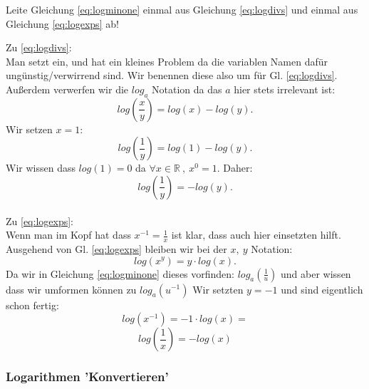 

\begin{question}
    Leite Gleichung \ref{eq:logminone} einmal aus Gleichung \ref{eq:logdivs} und einmal aus Gleichung \ref{eq:logexps} ab! 
\end{question}

\begin{answer}
Zu \ref{eq:logdivs}: \\
Man setzt ein, und hat ein kleines Problem da die variablen Namen dafür ungünstig/verwirrend sind. Wir benennen diese also um für Gl. \ref{eq:logdivs}. Außerdem verwerfen wir die $log_a$ Notation da das $a$ hier stets irrelevant ist:
$$ log \left(\frac{x}{y}\right) = log(x) - log(y).$$ 
Wir setzen $x=1$:
$$ log \left(\frac{1}{y}\right) = log(1) - log(y).$$
Wir wissen dass $log(1) = 0$ da $\forall x \in \mathbb{R} \: , \: x^0 = 1$. 
Daher: $$ log \left(\frac{1}{y}\right) = - log(y).$$ \\

Zu \ref{eq:logexps}: \\
Wenn man im Kopf hat dass $x^{-1}=\frac{1}{x}$ ist klar, dass auch hier einsetzten hilft. Ausgehend von Gl. \ref{eq:logexps} bleiben wir bei der $x, \: y$ Notation:
$$log (x ^ y) = y \cdot log(x).$$
Da wir in Gleichung \ref{eq:logminone} dieses vorfinden: $log_a \left( \frac{1}{u} \right)$ und aber wissen dass wir umformen können zu $log_a ( u^{-1}) $ 
Wir setzten $y=-1$ und sind eigentlich schon fertig:
$$log (x ^ {-1}) = -1 \cdot log(x) = $$
$$log \left( \frac{1}{x} \right) = -log(x)$$

\end{answer} 

\subsubsection{Logarithmen 'Konvertieren'}

